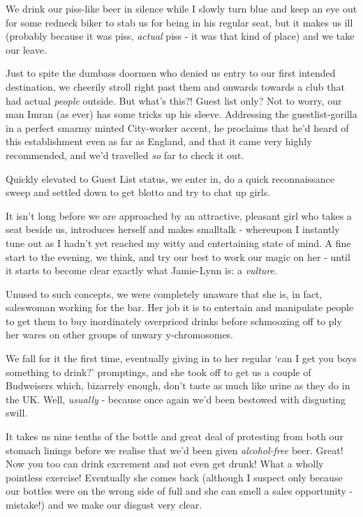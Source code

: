 \documentclass[a5paper,titlepage,11pt]{book}
\begin{document}
We drink our piss-like beer in silence while I slowly turn blue and keep an eye out for some redneck biker to stab us for being in his regular seat, but it makes us ill (probably because it was piss, \emph{actual} piss - it was that kind of place) and we take our leave.

Just to spite the dumbass doormen who denied us entry to our first intended destination, we cheerily stroll right past them and onwards towards a club that had actual \emph{people} outside. But what's this?!  Guest list only?  Not to worry, our man Imran (as ever) has some tricks up his sleeve. Addressing the guestlist-gorilla in a perfect smarmy minted City-worker accent, he proclaims that he'd heard of this establishment even as far as England, and that it came very highly recommended, and we'd travelled \emph{so} far to check it out.

Quickly elevated to Guest List status, we enter in, do a quick reconnaissance sweep and settled down to get blotto and try to chat up girls.

It isn't long before we are approached by an attractive, pleasant girl who takes a seat beside us, introduces herself and makes smalltalk - whereupon I instantly tune out as I hadn't yet reached my witty and entertaining state of mind. A fine start to the evening, we think, and try our best to work our magic on her - until it starts to become clear exactly what Jamie-Lynn is: a \emph{vulture}.

Unused to such concepts, we were completely unaware that she is, in fact, saleswoman working for the bar. Her job it is to entertain and manipulate people to get them to buy inordinately overpriced drinks before schmoozing off to ply her wares on other groups of unwary y-chromosomes.

We fall for it the first time, eventually giving in to her regular `can I get you boys something to drink?' promptings, and she took off to get us a couple of Budweisers which, bizarrely enough, don't taste as much like urine as they do in the UK. Well, \emph{usually} - because once again we'd been bestowed with disgusting swill.

It takes us nine tenths of the bottle and great deal of protesting from both our stomach linings before we realise that we'd been given \emph{alcohol-free} beer. Great!  Now you too can drink excrement and not even get drunk!  What a wholly pointless exercise!  Eventually she comes back (although I suspect only because our bottles were on the wrong side of full and she can smell a sales opportunity - mistake!) and we make our disgust very clear.
\end{document}
